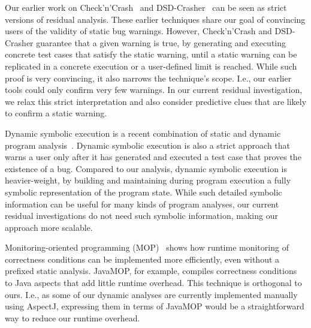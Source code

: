 Our earlier work on Check'n'Crash~\cite{csallner05check} and DSD-Crasher~\cite{csallner06dsd-crasher,smaragdakis07combining} can be seen as strict versions of residual analysis. These earlier techniques share our goal of convincing users of the validity of static bug warnings. However, Check'n'Crash and DSD-Crasher guarantee that a given warning is true, by generating and executing concrete test cases that satisfy the static warning, until a static warning can be replicated in a concrete execution or a user-defined limit is reached. While such proof is very convincing, it also narrows the technique's scope. I.e., our earlier tools could only confirm very few warnings. In our current residual investigation, we relax this strict interpretation and also consider predictive clues that are likely to confirm a static warning.

Dynamic symbolic execution is a recent combination of static and
dynamic program
analysis~\cite{godefroid05dart,cadar05execution,tillmann08pex,Islam14Generating}. Dynamic
symbolic execution is also a strict approach that warns a user only
after it has generated and executed a test case that proves the
existence of a bug. Compared to our analysis, dynamic symbolic
execution is heavier-weight, by building and maintaining
during program execution a fully symbolic representation of the
program state. While such detailed symbolic information can be useful
for many kinds of program analyses, our current residual
investigations do not need such symbolic information, making our
approach more scalable.

Monitoring-oriented programming (MOP)~\cite{chen07mop} shows how
runtime monitoring of correctness conditions can be implemented more
efficiently, even without a prefixed static analysis. JavaMOP, for
example, compiles correctness conditions to Java aspects that add
little runtime overhead. This technique is orthogonal to ours. I.e.,
as some of our dynamic analyses are currently implemented manually
using AspectJ, expressing them in terms of JavaMOP would be a
straightforward way to reduce our runtime overhead.

